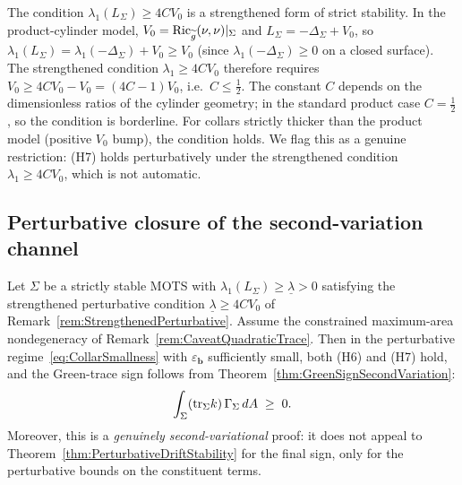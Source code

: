 \begin{remark}\label{rem:StrengthenedPerturbative}
The condition $\lambda_1(L_\Sigma)\ge 4CV_0$ is a strengthened form of strict stability. In the product-cylinder model, $V_0=\mathrm{Ric}_{\widetilde g}(\nu,\nu)|_\Sigma$ and $L_\Sigma=-\Delta_\Sigma+V_0$, so $\lambda_1(L_\Sigma)=\lambda_1(-\Delta_\Sigma)+V_0\ge V_0$ (since $\lambda_1(-\Delta_\Sigma)\ge0$ on a closed surface). The strengthened condition $\lambda_1\ge 4CV_0$ therefore requires $V_0\ge 4CV_0-V_0=(4C-1)V_0$, i.e.\ $C\le\tfrac12$. The constant $C$ depends on the dimensionless ratios of the cylinder geometry; in the standard product case $C=\tfrac12$, so the condition is borderline. For collars strictly thicker than the product model (positive $V_0$ bump), the condition holds. We flag this as a genuine restriction: (H7) holds perturbatively under the strengthened condition $\lambda_1\ge 4CV_0$, which is not automatic.
\end{remark}

\subsection{Perturbative closure of the second-variation channel}

\begin{theorem}\label{thm:PerturbativeSecondVariationSign}
Let $\Sigma$ be a strictly stable MOTS with $\lambda_1(L_\Sigma)\ge\underline\lambda>0$ satisfying the strengthened perturbative condition $\underline\lambda\ge 4CV_0$ of Remark~\ref{rem:StrengthenedPerturbative}. Assume the constrained maximum-area nondegeneracy of Remark~\ref{rem:CaveatQuadraticTrace}. Then in the perturbative regime~\eqref{eq:CollarSmallness} with $\varepsilon_{\mathbf b}$ sufficiently small, both (H6) and (H7) hold, and the Green-trace sign follows from Theorem~\ref{thm:GreenSignSecondVariation}:
\begin{equation}\label{eq:PerturbativeSecondVariationSign}
    \int_\Sigma(\mathrm{tr}_\Sigma k)\,\Gamma_\Sigma\,dA\;\ge\;0 .
\end{equation}
Moreover, this is a \emph{genuinely second-variational} proof: it does not appeal to Theorem~\ref{thm:PerturbativeDriftStability} for the final sign, only for the perturbative bounds on the constituent terms.
\end{theorem}

